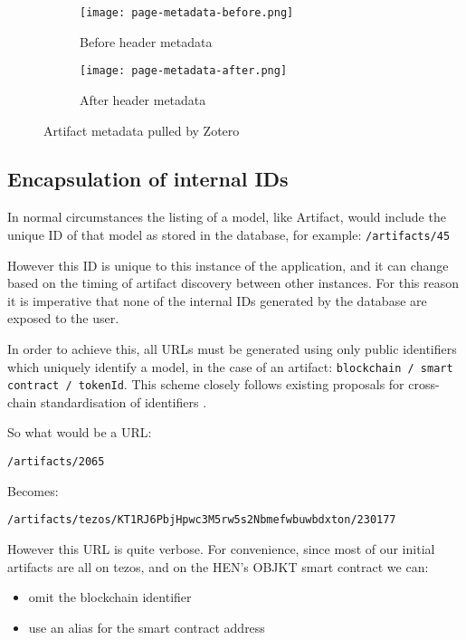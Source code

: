 \begin{figure}[H]
  \centering
  \begin{subfigure}[b]{0.45\textwidth}
    \centering
    \texttt{[image: page-metadata-before.png]}
    \caption{Before header metadata}
    \label{fig:image1}
  \end{subfigure}
  \hfill
  \begin{subfigure}[b]{0.45\textwidth}
    \centering
    \texttt{[image: page-metadata-after.png]}
    \caption{After header metadata}
    \label{fig:image2}
  \end{subfigure}
  \caption{Artifact metadata pulled by Zotero}
  \label{fig:zotero-metadata-comparison}
\end{figure}


\subsection{Encapsulation of internal IDs}

In normal circumstances the listing of a model, like Artifact, would include the unique ID of that model as stored in the database, for example: \texttt{/artifacts/45}

However this ID is unique to this instance of the application, and it can change based on the timing of artifact discovery between other instances.
For this reason it is imperative that none of the internal IDs generated by the database are exposed to the user.

In order to achieve this, all URLs must be generated using only public identifiers which uniquely identify a model, in the case of an artifact: \texttt{blockchain /  smart contract / tokenId}.
This scheme closely follows existing proposals for cross-chain standardisation of identifiers \cite{herzogAssetTypeAsset2020}.

So what would be a URL:

\texttt{/artifacts/2065}

Becomes:

\texttt{/artifacts/tezos/KT1RJ6PbjHpwc3M5rw5s2Nbmefwbuwbdxton/230177}


However this URL is quite verbose. For convenience, since most of our initial artifacts are all on tezos, and on the HEN's OBJKT smart contract we can:

\begin{itemize}
    \item omit the blockchain identifier
    \item use an alias for the smart contract address
\end{itemize}

